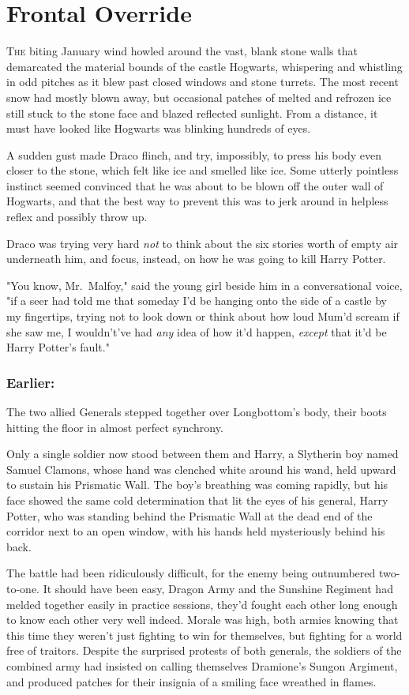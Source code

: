 \chapter{Frontal Override}

\lettrine{T}{he} biting
January wind howled around the vast, blank stone walls that demarcated the
material bounds of the castle Hogwarts, whispering and whistling in odd pitches
as it blew past closed windows and stone turrets. The most recent snow had
mostly blown away, but occasional patches of melted and refrozen ice still
stuck to the stone face and blazed reflected sunlight. From a distance, it must
have looked like Hogwarts was blinking hundreds of eyes.

A sudden gust made Draco flinch, and try, impossibly, to press his body even
closer to the stone, which felt like ice and smelled like ice. Some utterly
pointless instinct seemed convinced that he was about to be blown off the outer
wall of Hogwarts, and that the best way to prevent this was to jerk around in
helpless reflex and possibly throw up.

Draco was trying very hard \emph{not} to think about the six stories worth of
empty air underneath him, and focus, instead, on how he was going to kill Harry
Potter.

"You know, Mr.~Malfoy," said the young girl beside him in a conversational
voice, "if a seer had told me that someday I'd be hanging onto the side of a
castle by my fingertips, trying not to look down or think about how loud Mum'd
scream if she saw me, I wouldn't've had \emph{any} idea of how it'd happen,
\emph{except} that it'd be Harry Potter's fault."
\sbreak
\subsection{Earlier:}

The two allied Generals stepped together over Longbottom's body, their boots
hitting the floor in almost perfect synchrony.

Only a single soldier now stood between them and Harry, a Slytherin boy named
Samuel Clamons, whose hand was clenched white around his wand, held upward to
sustain his Prismatic Wall. The boy's breathing was coming rapidly, but his
face showed the same cold determination that lit the eyes of his general, Harry
Potter, who was standing behind the Prismatic Wall at the dead end of the
corridor next to an open window, with his hands held mysteriously behind his
back.

The battle had been ridiculously difficult, for the enemy being outnumbered
two-to-one. It should have been easy, Dragon Army and the Sunshine Regiment had
melded together easily in practice sessions, they'd fought each other long
enough to know each other very well indeed. Morale was high, both armies
knowing that this time they weren't just fighting to win for themselves, but
fighting for a world free of traitors. Despite the surprised protests of both
generals, the soldiers of the combined army had insisted on calling themselves
Dramione's Sungon Argiment, and produced patches for their insignia of a
smiling face wreathed in flames.

